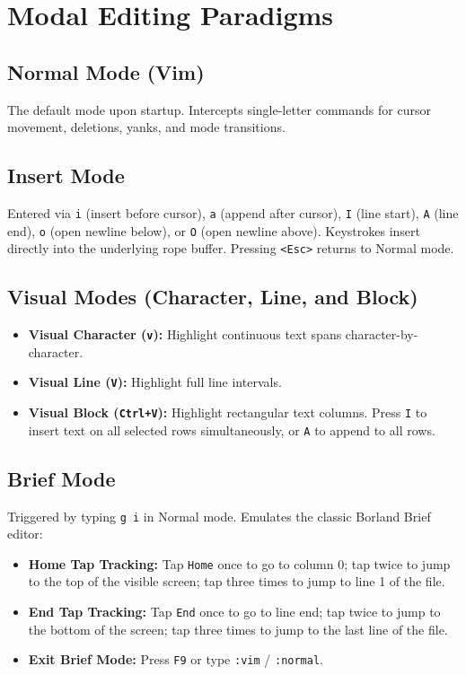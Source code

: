\documentclass[11pt,a4paper,openany]{book}
\newcommand{\code}[1]{\colorbox{inlinebg}{\texttt{#1}}}
\begin{document}
\chapter{Modal Editing Paradigms}

\section{Normal Mode (Vim)}
The default mode upon startup. Intercepts single-letter commands for cursor movement, deletions, yanks, and mode transitions.

\section{Insert Mode}
Entered via \code{i} (insert before cursor), \code{a} (append after cursor), \code{I} (line start), \code{A} (line end), \code{o} (open newline below), or \code{O} (open newline above). Keystrokes insert directly into the underlying rope buffer. Pressing \code{<Esc>} returns to Normal mode.

\section{Visual Modes (Character, Line, and Block)}
\begin{itemize}[noitemsep]
    \item \textbf{Visual Character (\code{v}):} Highlight continuous text spans character-by-character.
    \item \textbf{Visual Line (\code{V}):} Highlight full line intervals.
    \item \textbf{Visual Block (\code{Ctrl+V}):} Highlight rectangular text columns. Press \code{I} to insert text on all selected rows simultaneously, or \code{A} to append to all rows.
\end{itemize}

\section{Brief Mode}
Triggered by typing \code{g i} in Normal mode. Emulates the classic Borland Brief editor:
\begin{itemize}[noitemsep]
    \item \textbf{Home Tap Tracking:} Tap \code{Home} once to go to column 0; tap twice to jump to the top of the visible screen; tap three times to jump to line 1 of the file.
    \item \textbf{End Tap Tracking:} Tap \code{End} once to go to line end; tap twice to jump to the bottom of the screen; tap three times to jump to the last line of the file.
    \item \textbf{Exit Brief Mode:} Press \code{F9} or type \code{:vim} / \code{:normal}.
\end{itemize}
\end{document}
